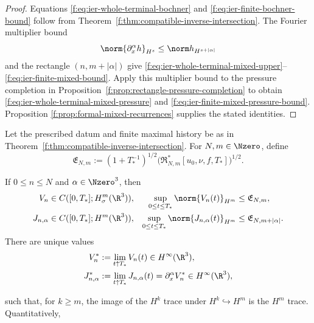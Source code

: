 \begin{proof}
Equations \eqref{f:eq:ier-whole-terminal-bochner} and
\eqref{f:eq:ier-finite-bochner-bound} follow from
Theorem~\ref{f:thm:compatible-inverse-intersection}.  The Fourier multiplier
bound
\[
 \norm{\partial_x^\alpha h}_{H^s}
 \le\norm h_{H^{s+|\alpha|}}
\]
and the rectangle \((n,m+|\alpha|)\) give
\eqref{f:eq:ier-whole-terminal-mixed-upper}--%
\eqref{f:eq:ier-finite-mixed-bound}.  Apply this multiplier bound to the
pressure completion in Proposition~\ref{f:prop:rectangle-pressure-completion}
to obtain \eqref{f:eq:ier-whole-terminal-mixed-pressure} and
\eqref{f:eq:ier-finite-mixed-pressure-bound}.  Proposition
\ref{f:prop:formal-mixed-recurrences} supplies the stated identities.
\end{proof}

\begin{theorem}
\label{f:thm:ier-compatible-endpoint-traces}
Let the prescribed datum and finite maximal history be as in
Theorem~\ref{f:thm:compatible-inverse-intersection}.
For \(N,m\in\Nzero\), define
\begin{equation}
 \mathfrak E_{N,m}
 :=(1+T_*^{-1})^{1/2}
 \bigl(\mathfrak R_{N,m}^*[u_0,\nu,f,T_*]\bigr)^{1/2}.
 \label{f:eq:ier-endpoint-majorant}
\end{equation}
\begin{samepage}
If \(0\le n\le N\) and \(\alpha\in\Nzero^3\), then
\begin{align}
 V_n&\in C([0,T_*];H^m_\sigma(\R^3)),
 &\sup_{0\le t\le T_*}\norm{V_n(t)}_{H^m}
 &\le\mathfrak E_{N,m},
 \label{f:eq:ier-row-trace}\\
 J_{n,\alpha}&\in C([0,T_*];H^m(\R^3)),
 &\sup_{0\le t\le T_*}\norm{J_{n,\alpha}(t)}_{H^m}
 &\le\mathfrak E_{N,m+|\alpha|}.
 \label{f:eq:ier-mixed-row-trace}
\end{align}
There are unique values
\begin{align}
 V_n^*&:=\lim_{t\uparrow T_*}V_n(t)
 \in H^\infty(\R^3),
 \label{f:eq:ier-velocity-endpoint}\\
 J_{n,\alpha}^*&:=\lim_{t\uparrow T_*}J_{n,\alpha}(t)
 =\partial_x^\alpha V_n^*
 \in H^\infty(\R^3),
 \label{f:eq:ier-mixed-velocity-endpoint}
\end{align}
\par
\end{samepage}
such that, for \(k\ge m\), the image of the \(H^k\) trace under
\(H^k\hookrightarrow H^m\) is the \(H^m\) trace.  Quantitatively,
\begin{align}

\end{align}
\end{theorem}
